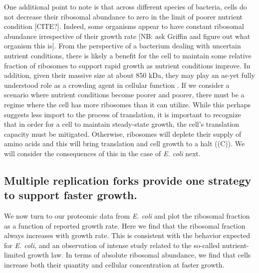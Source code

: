 One additional point to note is that across
different species of bacteria, cells do not decrease their
ribosomal abundance to zero in the limit of poorer nutrient condition [CITE?]. Indeed,
some organisms appear to have constant ribosomal abundance irrespective of their
growth rate [NB: ask Griffin and figure out what organism this is]. From the
perspective of a bacterium dealing with uncertain nutrient conditions, there is
likely a benefit for the cell to maintain some relative fraction of ribosomes to
support rapid growth as nutrient conditions improve. In addition, given their
massive size at about 850 kDa, they may play an as-yet fully understood role as
a crowding agent in cellular function \cite{delarue2018, solerbistue2020}. If we
consider a scenario where nutrient conditions become poorer and poorer, there
must be a regime where the cell has more ribosomes than it can utilize. While
this perhaps suggests less import to the  process of translation, it is
important to recognize that in order for a cell to maintain steady-state growth,
the cell's translation capacity must be mitigated. Otherwise, ribosomes will
deplete their supply of amino acids and this will bring translation and cell
growth to a halt ((C)). We will consider the consequences of
this in the case of \textit{E. coli} next.


\subsection{Multiple replication forks provide one strategy to support faster growth.}


We now turn to our proteomic data from \textit{E. coli} and plot the ribosomal
fraction as a function of reported growth rate. Here we find that the ribosomal
fraction always increases with growth rate. This is consistent with the behavior
expected for \textit{E. coli}, and an observation of intense study related to
the so-called nutrient-limited growth law. In terms of absolute ribosomal
abundance, we find that cells increase both their quantity and cellular
concentration at faster growth.

